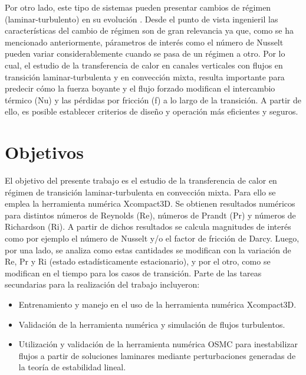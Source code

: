 Por otro lado, este tipo de sistemas pueden presentar cambios de régimen (laminar-turbulento) en su evolución \cite{schlatter2005}. Desde el punto de vista ingenieril las características del cambio de régimen son de gran relevancia ya que, como se ha mencionado anteriormente, párametros de interés como el número de Nusselt pueden variar considerablemente cuando se pasa de un régimen a otro. Por lo cual, el estudio de la transferencia de calor en canales verticales con flujos en transición laminar-turbulenta y en convección mixta, resulta importante para predecir cómo la fuerza boyante y el flujo forzado modifican el intercambio térmico (Nu) y las pérdidas por fricción (f) a lo largo de la transición. A partir de ello, es posible establecer criterios de diseño y operación más eficientes y seguros.




\section{Objetivos}

El objetivo del presente trabajo es el estudio de la transferencia de calor en régimen de transición laminar-turbulenta en convección mixta. Para ello se emplea la herramienta numérica Xcompact3D. Se obtienen resultados numéricos para distintos números de Reynolds (Re), números de Prandt (Pr) y números de Richardson (Ri). A partir de dichos resultados se calcula magnitudes de interés como por ejemplo el número de Nusselt y/o el factor de fricción de Darcy. Luego, por una lado, se analiza como estas cantidades se modifican  con la variación de Re, Pr y Ri (estado estadísticamente estacionario), y por el otro, como se modifican en el tiempo para los casos de transición. Parte de las tareas secundarias para la realización del trabajo incluyeron:

\begin{itemize}

	\item Entrenamiento y manejo en el uso de la herramienta numérica Xcompact3D.
	
	\item Validación de la herramienta numérica y simulación de flujos turbulentos.

	\item Utilización y validación de la herramienta numérica OSMC \cite{szuban2023} para inestabilizar flujos a partir de soluciones laminares mediante perturbaciones generadas de la teoría de estabilidad lineal.

\end{itemize}

